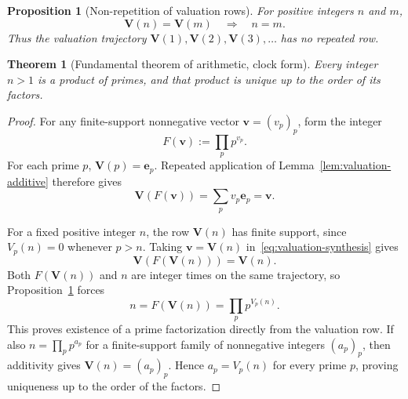 \documentclass[10pt,a4paper]{amsart}
\newtheorem{proposition}{Proposition}
\newtheorem{theorem}{Theorem}
\newcommand{\V}{\mathbf V}
\begin{document}
\begin{proposition}[Non-repetition of valuation rows]
\label{prop:valuation-nonrepetition}
For positive integers $n$ and $m$,
\begin{equation}
\V(n)=\V(m)\quad\Longrightarrow\quad n=m.
\label{eq:valuation-injective}
\end{equation}
Thus the valuation trajectory $\V(1),\V(2),\V(3),\ldots$ has no repeated row.
\end{proposition}

\begin{theorem}[Fundamental theorem of arithmetic, clock form]
\label{prop:clock-fta}
Every integer $n>1$ is a product of primes, and that product is unique up to the order of its factors.
\end{theorem}

\begin{proof}
For any finite-support nonnegative vector $\mathbf v=(v_p)_p$, form the integer
\[
F(\mathbf v):=\prod_p p^{v_p}.
\]
For each prime $p$, $\V(p)=\mathbf e_p$. Repeated application of Lemma~\ref{lem:valuation-additive} therefore gives
\begin{equation}
\V(F(\mathbf v))=\sum_p v_p\mathbf e_p=\mathbf v.
\label{eq:valuation-synthesis}
\end{equation}

For a fixed positive integer $n$, the row $\V(n)$ has finite support, since $V_p(n)=0$ whenever $p>n$. Taking $\mathbf v=\V(n)$ in~\eqref{eq:valuation-synthesis} gives
\[
\V(F(\V(n)))=\V(n).
\]
Both $F(\V(n))$ and $n$ are integer times on the same trajectory, so Proposition~\ref{prop:valuation-nonrepetition} forces
\[
n=F(\V(n))=\prod_p p^{V_p(n)}.
\]
This proves existence of a prime factorization directly from the valuation row. If also $n=\prod_p p^{a_p}$ for a finite-support family of nonnegative integers $(a_p)_p$, then additivity gives $\V(n)=(a_p)_p$. Hence $a_p=V_p(n)$ for every prime $p$, proving uniqueness up to the order of the factors.
\end{proof}
\end{document}
